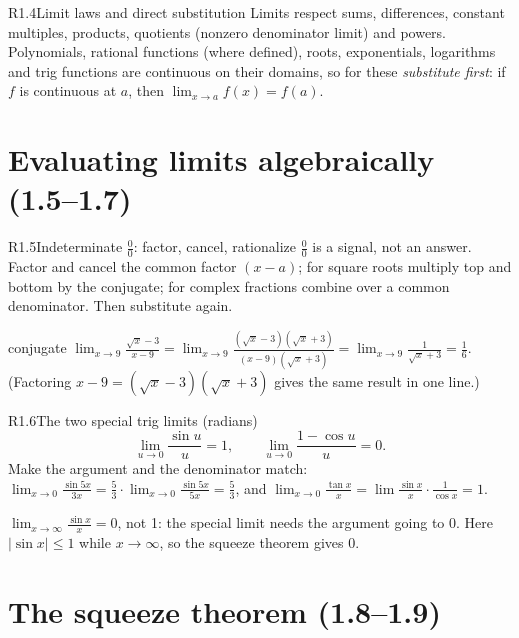 \documentclass{apcalc}
\begin{document}
\begin{rulebox}{R1.4}{Limit laws and direct substitution}
Limits respect sums, differences, constant multiples, products, quotients (nonzero denominator limit) and powers. Polynomials, rational functions (where defined), roots, exponentials, logarithms and trig functions are continuous on their domains, so for these \emph{substitute first}: if $f$ is continuous at $a$, then $\lim_{x\to a}f(x)=f(a)$.
\end{rulebox}

\section{Evaluating limits algebraically (1.5--1.7)}

\begin{rulebox}{R1.5}{Indeterminate $\tfrac00$: factor, cancel, rationalize}
$\tfrac00$ is a signal, not an answer. Factor and cancel the common factor $(x-a)$; for square roots multiply top and bottom by the conjugate; for complex fractions combine over a common denominator. Then substitute again.
\end{rulebox}

\begin{example}{conjugate}
$\displaystyle\lim_{x\to9}\frac{\sqrt{x}-3}{x-9}=\lim_{x\to9}\frac{(\sqrt{x}-3)(\sqrt{x}+3)}{(x-9)(\sqrt{x}+3)}=\lim_{x\to9}\frac{1}{\sqrt{x}+3}=\frac16.$
(Factoring $x-9=(\sqrt x-3)(\sqrt x+3)$ gives the same result in one line.)
\end{example}

\begin{rulebox}{R1.6}{The two special trig limits (radians)}
\[\lim_{u\to0}\frac{\sin u}{u}=1,\qquad \lim_{u\to0}\frac{1-\cos u}{u}=0.\]
Make the argument and the denominator match: $\displaystyle\lim_{x\to0}\frac{\sin 5x}{3x}=\frac53\cdot\lim_{x\to0}\frac{\sin5x}{5x}=\frac53$, and $\displaystyle\lim_{x\to0}\frac{\tan x}{x}=\lim\frac{\sin x}{x}\cdot\frac1{\cos x}=1$.
\end{rulebox}

\begin{trap}
$\lim_{x\to\infty}\frac{\sin x}{x}=0$, not 1: the special limit needs the argument going to 0. Here $|\sin x|\le1$ while $x\to\infty$, so the squeeze theorem gives 0.
\end{trap}

\section{The squeeze theorem (1.8--1.9)}
\end{document}

